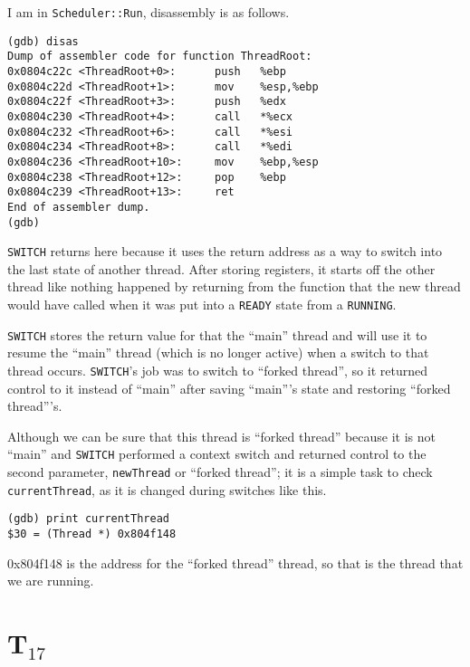 \documentclass[letterpaper, 10pt]{article}
\begin{document}
	\begin{itemize}
		\item[a.]{
			I am in {\tt Scheduler::Run}, disassembly is as follows.

			\begin{verbatim}
(gdb) disas
Dump of assembler code for function ThreadRoot:
0x0804c22c <ThreadRoot+0>:      push   %ebp
0x0804c22d <ThreadRoot+1>:      mov    %esp,%ebp
0x0804c22f <ThreadRoot+3>:      push   %edx
0x0804c230 <ThreadRoot+4>:      call   *%ecx
0x0804c232 <ThreadRoot+6>:      call   *%esi
0x0804c234 <ThreadRoot+8>:      call   *%edi
0x0804c236 <ThreadRoot+10>:     mov    %ebp,%esp
0x0804c238 <ThreadRoot+12>:     pop    %ebp
0x0804c239 <ThreadRoot+13>:     ret
End of assembler dump.
(gdb)
			\end{verbatim}
		}
		\item[a.]{
		{\tt SWITCH} returns here because it uses the return address as a way to switch into the last state of another thread. After storing registers, it starts off the other thread like nothing happened by returning from the function that the new thread would have called when it was put into a {\tt READY} state from a {\tt RUNNING}.
		\item[b.]{
		{\tt SWITCH} stores the return value for that the ``main'' thread and will use it to resume the ``main'' thread (which is no longer active) when a switch to that thread occurs. {\tt SWITCH}'s job was to switch to ``forked thread'', so it returned control to it instead of ``main'' after saving ``main'''s state and restoring ``forked thread'''s.
		}
		\item[c.]{

			Although we can be sure that this thread is ``forked thread'' because it is not ``main'' and {\tt SWITCH} performed a context switch and returned control to the second parameter, {\tt newThread} or ``forked thread''; it is a simple task to check {\tt currentThread}, as it is changed during switches like this.

			\begin{verbatim}
(gdb) print currentThread
$30 = (Thread *) 0x804f148
			\end{verbatim}

			0x804f148 is the address for the ``forked thread'' thread, so that is the thread that we are running.

		}
		}
	\end{itemize}

	\section*{T$_{17}$}
\end{document}
